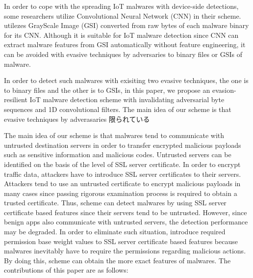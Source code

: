 In order to cope with the spreading IoT malwares with device-side detections, some researchers utilize Convolutional Neural Network (CNN) in their scheme.
\cite{} utilezes GrayScale Image (GSI) converted from raw bytes of each malware binary for its CNN.
Although it is suitable for IoT malware detection since CNN can extract malware features from GSI automatically without feature engineering, it can be avoided with evasive techniques by adversaries to binary files or GSIs of malware. 

In order to detect such malwares with exisiting two evasive techniques, the one is to binary files and the other is to GSIs, in this paper, we propose an evasion-resilient IoT malware detection scheme with invalidating adversarial byte sequences and 1D convolutional filters.
The main idea of our scheme is that evasive techniques by adverasaries 限られている 

The main idea of our scheme is that malwares tend to communicate with untrusted destination servers in order to transfer encrypted malicious payloads such as sensitive information and malicious codes.
Untrusted servers can be identified on the basis of the level of SSL server certificate.
In order to encrypt traffic data, attackers have to introduce SSL server certificates to their servers.
Attackers tend to use an untrusted certificate to encrypt malicious payloads in many cases since passing rigorous examination process is required to obtain a trusted certificate.
Thus, \our scheme can detect malwares by using SSL server certificate based features since their servers tend to be untrusted.
However, since benign apps also communicate with untrusted servers, the detection performance may be degraded.
In order to eliminate such situation, \we introduce required permission base weight values to SSL server certificate based features because malwares inevitably have to require the permissions regarding malicious actions.
By doing this, \our scheme can obtain the more exact features of malwares. 
The contributions of this paper are as follows: 

